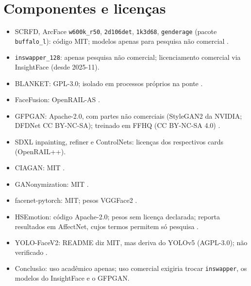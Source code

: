 \chapter{Componentes e licenças}
\label{ap:licencas}


\begin{itemize}
\item SCRFD, ArcFace \texttt{w600k\_r50}, \texttt{2d106det}, \texttt{1k3d68}, \texttt{genderage} (pacote \texttt{buffalo\_l}): código MIT; modelos apenas para pesquisa não comercial \citep{insightface}.
\item \texttt{inswapper\_128}: apenas pesquisa não comercial; licenciamento comercial via InsightFace (desde 2025-11).
\item BLANKET: GPL-3.0; isolado em processos próprios na ponte \citep{blanket}.
\item FaceFusion: OpenRAIL-AS \citep{facefusion}.
\item GFPGAN: Apache-2.0, com partes não comerciais (StyleGAN2 da NVIDIA; DFDNet CC BY-NC-SA); treinado em FFHQ (CC BY-NC-SA 4.0) \citep{gfpgan,ffhq}.
\item SDXL inpainting, refiner e ControlNets: licenças dos respectivos cards (OpenRAIL++).
\item CIAGAN: MIT \citep{ciagan}.
\item GANonymization: MIT \citep{hellmann}.
\item facenet-pytorch: MIT; pesos VGGFace2 \citep{facenetpytorch,vggface2}.
\item HSEmotion: código Apache-2.0; pesos sem licença declarada; reporta resultados em AffectNet, cujos termos permitem só pesquisa \citep{hsemotion,affectnet}.
\item YOLO-FaceV2: README diz MIT, mas deriva do YOLOv5 (AGPL-3.0); não verificado \citep{yolofacev2}.
\item Conclusão: uso acadêmico apenas; uso comercial exigiria trocar \texttt{inswapper}, os modelos do InsightFace e o GFPGAN.
\end{itemize}
